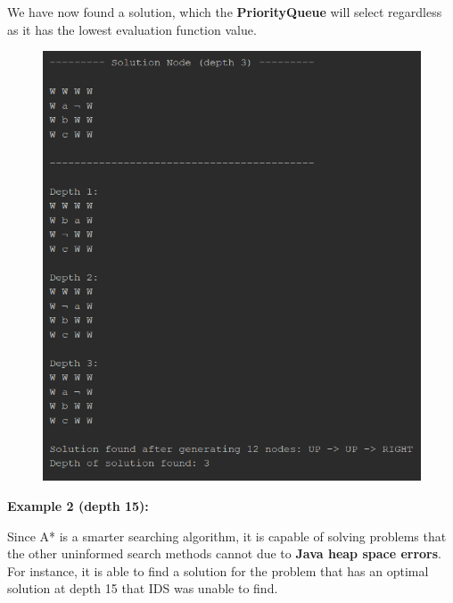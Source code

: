 \documentclass{article}
\begin{document}
	\newpage
	We have now found a solution, which the \textbf{PriorityQueue} will select regardless as it has the lowest evaluation function value.
	
	\begin{figure}[h]
		\centering
		\includegraphics[height=0.75\textheight]{AStar-1-4.png}
	\end{figure}

	\newpage
	\textbf{Example 2 (depth 15):}
	
	Since A* is a smarter searching algorithm, it is capable of solving problems that the other uninformed search methods cannot due to \textbf{Java heap space errors}. For instance, it is able to find a solution for the problem that has an optimal solution at depth 15 that IDS was unable to find.
	
\end{document}
